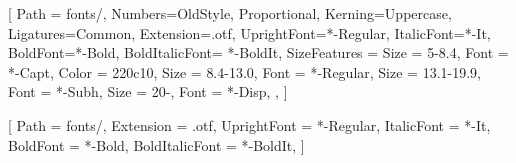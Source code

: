 




\usepackage{mathspec}

% 
% 
%

\setmainfont{MinionPro}[%
    Path = fonts/,
    Numbers={OldStyle, Proportional},
    Kerning=Uppercase,
    Ligatures={Common},
    Extension=.otf,
    UprightFont=*-Regular,
    ItalicFont=*-It,
    BoldFont=*-Bold,
    BoldItalicFont= *-BoldIt,
    SizeFeatures = {
        {Size = {5-8.4}, Font = *-Capt, Color = 220c10},
        {Size = {8.4-13.0}, Font = *-Regular},
        {Size = {13.1-19.9}, Font = *-Subh},
        {Size = {20-}, Font = *-Disp},
    },
]

\setsansfont{MyriadPro}[%
    Path = fonts/,
    Extension = .otf,
    UprightFont = *-Regular,
    ItalicFont = *-It,
    BoldFont = *-Bold,
    BoldItalicFont = *-BoldIt,
]